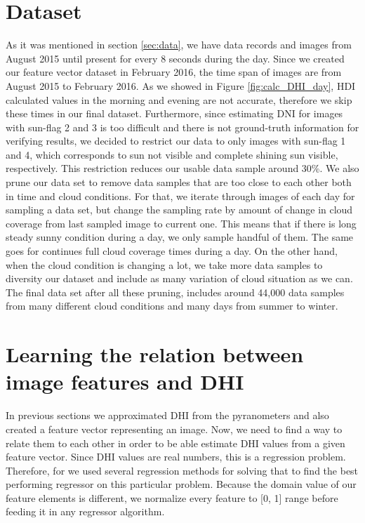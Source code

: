 \section{Dataset}
As it was mentioned in section \ref{sec:data}, we have data records and images from August 2015 until present for every 8 seconds during the day. Since we created our feature vector dataset in February 2016, the time span of images are from August 2015 to February 2016. As we showed in Figure \ref{fig:calc_DHI_day}, HDI calculated values in the morning and evening are not accurate, therefore we skip these times in our final dataset. Furthermore, since estimating DNI for images with sun-flag 2 and 3 is too difficult and there is not ground-truth information for verifying results, we decided to restrict our data to only images with sun-flag 1 and 4, which corresponds to sun not visible and complete shining sun visible, respectively. This restriction reduces our usable data sample around 30\%. We also prune our data set to remove data samples that are too close to each other both in time and cloud conditions. For that, we iterate through images of each day for sampling a data set, but change the sampling rate by amount of change in cloud coverage from last sampled image to current one. This means that if there is long steady sunny condition during a day, we only sample handful of them. The same goes for continues full cloud coverage times during a day. On the other hand, when the cloud condition is changing a lot, we take more data samples to diversity our dataset and include as many variation of cloud situation as we can. The final data set after all these pruning, includes around 44,000 data samples from many different cloud conditions and many days from summer to winter.

\section{Learning the relation between image features and DHI}
In previous sections we approximated DHI from the pyranometers and also created a feature vector representing an image. Now, we need to find a way to relate them to each other in order to be able estimate DHI values from a given feature vector. Since DHI values are real numbers, this is a regression problem. 
Therefore, for we used several regression methods for solving that to find the best performing regressor on this particular problem. Because the domain value of our feature elements is different, we normalize every feature to [0, 1] range before feeding it in any regressor algorithm. 

